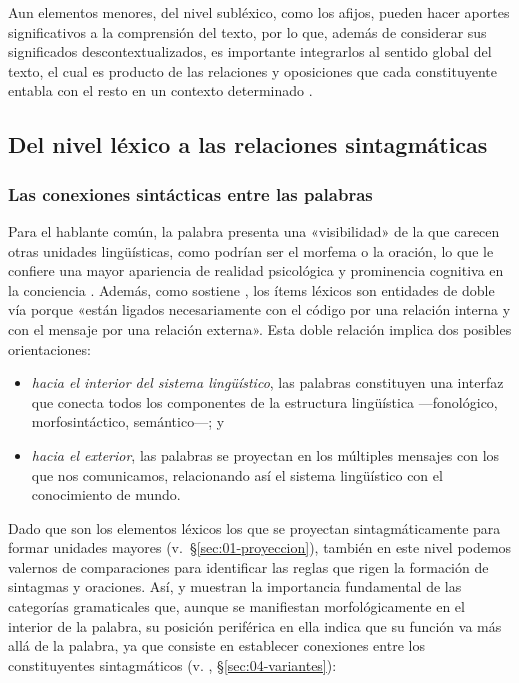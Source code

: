 \begin{recuadro}
Aun elementos menores, del nivel subléxico, como los afijos, pueden hacer
aportes significativos a la comprensión del texto, por lo que, además de
considerar sus significados descontextualizados, es importante integrarlos al
sentido global del texto, el cual es producto de las relaciones y oposiciones
que cada constituyente entabla con el resto en un contexto determinado
\parencite{giammatteo2015}.
\end{recuadro}

\subsection{Del nivel léxico a las relaciones sintagmáticas}

\subsubsection{Las conexiones sintácticas entre las palabras}

Para el hablante común, la palabra presenta una «visibilidad» de la que carecen
otras unidades lingüísticas, como podrían ser el morfema o la oración, lo que le
confiere una mayor apariencia de realidad psicológica y prominencia cognitiva
en la conciencia \parencite{julien2007}. Además, como sostiene
\textcite[49]{jakobson1967}, los ítems léxicos son entidades de doble vía
porque «están ligados necesariamente con el código por una relación interna y
con el mensaje por una relación externa». Esta doble relación implica dos
posibles orientaciones:

\begin{itemize}
  \item \textit{hacia el interior del sistema lingüístico}, las palabras
        constituyen una interfaz \parencite{jackendoff1990} que conecta todos
        los componentes de la estructura lingüística ---fonológico,
        morfosintáctico, semántico---; y
  \item \textit{hacia el exterior}, las palabras se proyectan en los múltiples
        mensajes con los que nos comunicamos, relacionando así el sistema
        lingüístico con el conocimiento de mundo.
\end{itemize}

Dado que son los elementos léxicos los que se proyectan sintagmáticamente para
formar unidades mayores (v.~§\ref{sec:01-proyeccion}), también en este nivel
podemos valernos de comparaciones para identificar las reglas que rigen la
formación de sintagmas y oraciones. Así,  y
 muestran la importancia fundamental de las categorías
gramaticales que, aunque se manifiestan morfológicamente en el interior de la
palabra, su posición periférica en ella indica que su función va más allá de la
palabra, ya que consiste en establecer conexiones entre los constituyentes
sintagmáticos (v. , §\ref{sec:04-variantes}):

